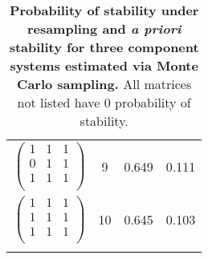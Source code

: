 \documentclass{amsart}
\theoremstyle{definition}
\theoremstyle{remark}
\numberwithin{equation}{section}
\begin{document}
\begin{longtable}{ c || c | c | c }
$\begin{pmatrix}
1 & 1 & 1\\
0 & 1 & 1\\
1 & 1 & 1\\
\end{pmatrix}$ & 9 & 0.649 & 0.111\\
$\begin{pmatrix}
1 & 1 & 1\\
1 & 1 & 1\\
1 & 1 & 1\\
\end{pmatrix}$ & 10 & 0.645 & 0.103\\
\caption{{\bf Probability of stability under resampling and \emph{a priori} stability for three component systems estimated via Monte Carlo sampling.} All matrices not listed have $0$ probability of stability.}\label{tab:structstabmat3}
\end{longtable}
%








\end{document}

